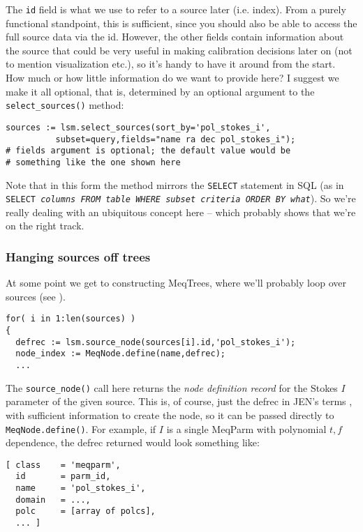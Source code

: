 \documentclass[]{lofar}
\begin{document}
  The {\tt id} field is what we use to refer to a source later (i.e. index). From
  a purely functional standpoint, this is sufficient, since you should also be
  able to access the full source data via the id. However, the other fields
  contain information about the source that could be very useful in making
  calibration decisions later on (not to mention visualization etc.), so it's
  handy to have it around from the start. How much or how little information do
  we want to provide here? I suggest we make it all optional, that is, determined
  by an optional argument to the {\tt select\_sources()} method:
  
\begin{verbatim}
sources := lsm.select_sources(sort_by='pol_stokes_i',
          subset=query,fields="name ra dec pol_stokes_i"); 
# fields argument is optional; the default value would be 
# something like the one shown here
\end{verbatim}
  
  Note that in this form the method mirrors the {\tt SELECT} statement in SQL (as
  in {\tt SELECT \em columns\tt\ FROM \em table\tt\  WHERE \em subset
  criteria\tt\ ORDER BY \em what}). So we're really dealing with an ubiquitous
  concept here -- which probably shows that we're on the right track. 
  
\subsubsection{Hanging sources off trees}
  
  At some point we get to constructing MeqTrees, where we'll probably loop over
  sources (see \cite{PSS4}). 
  
\begin{verbatim}
for( i in 1:len(sources) )
{
  defrec := lsm.source_node(sources[i].id,'pol_stokes_i');
  node_index := MeqNode.define(name,defrec);
  ...
\end{verbatim}
  
  The {\tt source\_node()} call here returns the {\em node definition record} for
  the Stokes $I$ parameter of the given source. This is, of course, just the
  defrec in JEN's terms \cite{PSS4}, with sufficient information to create the
  node, so it can be passed directly to {\tt MeqNode.define()}. For example, if
  $I$ is a single MeqParm with polynomial $t,f$ dependence, the defrec returned
  would look something like:
  
\begin{verbatim}
[ class    = 'meqparm',
  id       = parm_id,
  name     = 'pol_stokes_i',
  domain   = ...,
  polc     = [array of polcs],
  ... ]
\end{verbatim} 
  
\end{document}
